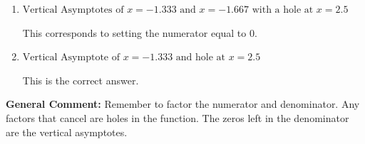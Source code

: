 \documentclass{extbook}[14pt]
\begin{document}
\begin{enumerate}
{\begin{enumerate}[label=\Alph*.]
This corresponds to not factoring out the hole.
\item \( \text{Vertical Asymptotes of } x = -1.333 \text{ and } x = -1.667 \text{ with a hole at } x = 2.5 \)

This corresponds to setting the numerator equal to 0.
\item \( \text{Vertical Asymptote of } x = -1.333 \text{ and hole at } x = 2.5 \)

This is the correct answer.
\end{enumerate}

\textbf{General Comment:} Remember to factor the numerator and denominator. Any factors that cancel are holes in the function. The zeros left in the denominator are the vertical asymptotes.
}
\end{enumerate}
\end{document}
